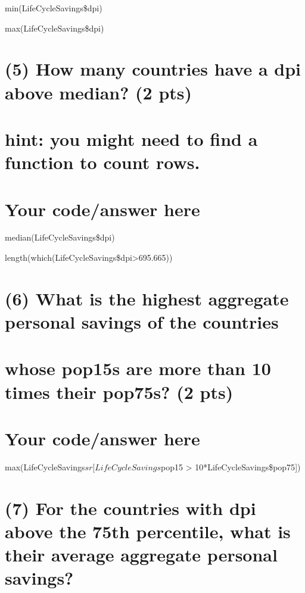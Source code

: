 \documentclass[]{article}
\begin{document}
min(LifeCycleSavings\$dpi)

max(LifeCycleSavings\$dpi)

\section{(5) How many countries have a dpi above median? (2
pts)}\label{how-many-countries-have-a-dpi-above-median-2-pts}

\section{hint: you might need to find a function to count
rows.}\label{hint-you-might-need-to-find-a-function-to-count-rows.}

\section{Your code/answer here}\label{your-codeanswer-here-4}

median(LifeCycleSavings\$dpi)

length(which(LifeCycleSavings\$dpi\textgreater{}695.665))

\section{(6) What is the highest aggregate personal savings of the
countries}\label{what-is-the-highest-aggregate-personal-savings-of-the-countries}

\section{whose pop15s are more than 10 times their pop75s? (2
pts)}\label{whose-pop15s-are-more-than-10-times-their-pop75s-2-pts}

\section{Your code/answer here}\label{your-codeanswer-here-5}

max(LifeCycleSavings\(sr[LifeCycleSavings\)pop15 \textgreater{}
10*LifeCycleSavings\$pop75{]})

\section{(7) For the countries with dpi above the 75th percentile, what
is their average aggregate personal
savings?}\label{for-the-countries-with-dpi-above-the-75th-percentile-what-is-their-average-aggregate-personal-savings}
\end{document}

